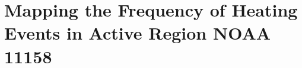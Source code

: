 \chapter{Mapping the Frequency of Heating Events in Active Region NOAA 11158}\label{ch:classifying_observables}